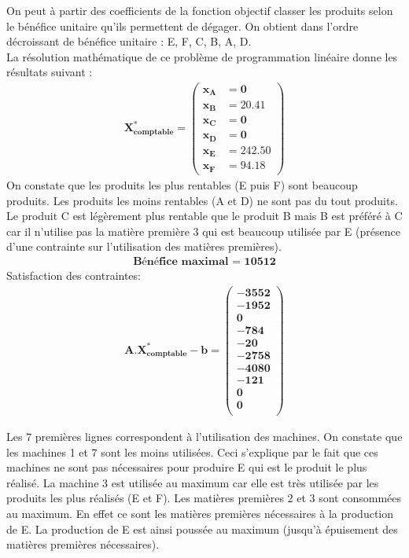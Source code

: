 \documentclass[12pt]{article}
\begin{document}
On peut à partir des coefficients de la fonction objectif classer les produits selon le bénéfice unitaire qu'ils permettent de dégager. On obtient dans l'ordre décroissant de bénéfice unitaire : E, F, C, B, A, D.\\
La résolution mathématique de ce problème de programmation linéaire donne les résultats suivant :
\begin{align*} 
	\boldsymbol{X^{*}_{comptable} = 
   \left (
   \begin{aligned}
      x_{A} &= 0 \\
      x_{B} &= 20.41 \\
      x_{C} &= 0 \\
      x_{D} &= 0 \\
      x_{E} &= 242.50 \\
      x_{F} &= 94.18 
   \end{aligned}
   \right )
 }
\end{align*}
On constate que les produits les plus rentables (E puis F) sont beaucoup produits. Les produits
les moins rentables (A et D) ne sont pas du tout produits. Le produit C est légèrement plus rentable que le produit B mais B est préféré à C car il n'utilise pas la matière première 3 qui est beaucoup utilisée par E (présence d'une contrainte sur l'utilisation des matières premières).
\begin{align*}
\textbf{Bénéfice maximal = 10512}
\end{align*}
Satisfaction des contraintes: 
\begin{align*} 
	\boldsymbol{A.X^{*}_{comptable} - b = 
   \left (
   \begin{aligned}
      -3552 \\
      -1952 \\
      0 \\
      -784 \\
      -20 \\
      -2758 \\
      -4080 \\
      -121 \\
      0 \\
      0\\
   \end{aligned}
   \right )}
\end{align*}
\begin{center}

\end{center}
Les 7 premières lignes correspondent à l’utilisation des machines. On constate que les
machines 1 et 7 sont les moins utilisées. Ceci s’explique par le fait que ces machines ne sont
pas nécessaires pour produire E qui est le produit le plus réalisé. La machine 3 est utilisée au maximum car elle est très utilisée par les produits les plus réalisés (E et F). Les matières premières 2 et 3 sont consommées au maximum. En effet ce sont les matières premières nécessaires à la production de E. La production de E est ainsi poussée au maximum (jusqu'à épuisement des matières premières nécessaires).
\end{document}
